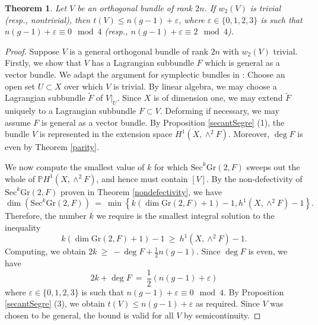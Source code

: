 \documentclass[10pt]{amsart}
\numberwithin{equation}{section}
\newcommand{\pp}{\mathbb P}
\newcommand{\cc}{\mathbb C}
\newcommand{\Sec}{\mathrm{Sec}}
\newcommand{\Gr}{\mathrm{Gr}}
\newtheorem{theorem}{{\textbf Theorem}}[section]
\begin{document}
\begin{theorem} \label{upperbound} Let $V$ be an orthogonal bundle of rank $2n$. If $w_2 (V)$ is trivial (resp., nontrivial), then $t(V) \le n(g-1) + \varepsilon$, where $\varepsilon \in \{0, 1, 2, 3 \}$ is such that $n(g-1) + \varepsilon \equiv 0 \mod 4$ (resp., $n(g-1) + \varepsilon \equiv 2 \mod 4$). \end{theorem}

\begin{proof} Suppose $V$ is a general orthogonal bundle of rank $2n$ with $w_2(V)$ trivial. Firstly, we show that $V$ has a Lagrangian subbundle $F$ which is general as a vector bundle. We adapt the argument for symplectic bundles in \cite[Lemma 3.2]{CH2}: Choose an open set $U \subset X$ over which $V$ is trivial. By linear algebra, we may choose a Lagrangian subbundle $\tilde{F}$ of $V|_U$.  %
Since $X$ is of dimension one, we may extend $\tilde{F}$ uniquely to a Lagrangian subbundle $F \subset V$. Deforming if necessary, we may assume $F$ is general as a vector bundle. By Proposition \ref{secantSegre} (1), the bundle $V$ is represented in the extension space $H^1 (X, \wedge^2 F)$. Moreover, $\deg F$ is even by Theorem \ref{parity}. 

We now compute the smallest value of $k$ for which $\Sec^k \Gr(2, F)$ sweeps out the whole of $\pp H^1 (X, \wedge^2 F )$, and hence must contain $[V]$. By the non-defectivity of $\Sec^k \Gr(2, F)$ proven in Theorem \ref{nondefectivity}, we have
\[ \dim \left( \Sec^k \Gr (2, F) \right) \ = \ \min \left\{ k (\dim \Gr(2, F) + 1) - 1, h^1 (X, \wedge^2 F) - 1 \right\}. \]
Therefore, the number $k$ we require is the smallest integral solution to the inequality
\[ k (\dim \Gr(2, F) + 1) - 1 \ \ge \ h^1 (X, \wedge^2 F) - 1. \]
Computing, we obtain
 $2k \ \ge \ -\deg F + \frac{1}{2}n(g-1)$. Since $\deg F$ is even, we have
\[ 2k + \deg F \ = \ \frac{1}{2} \left( n(g-1) + \varepsilon \right) \]
where $\varepsilon \in \{ 0, 1, 2, 3 \}$ is such that $n(g-1) + \varepsilon \equiv 0 \mod 4$. By Proposition \ref{secantSegre} (3), we obtain $t(V) \le n(g-1) + \varepsilon$ as required. Since $V$ was chosen to be general, the bound is valid for all $V$ by semicontinuity.


\end{proof}
\end{document}
